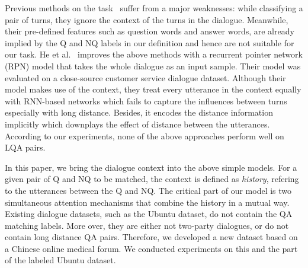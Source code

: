 Previous methods on the task~\cite{ding2008using,du2017discovering,jiang2018learning} suffer from a major weaknesses: while classifying a pair of turns, they ignore the context of the turns in the dialogue. Meanwhile, their pre-defined features such as question words and answer words, are already implied by the Q and NQ labels in our definition and hence are not suitable for our task. He et al.~ improves the above methods with a recurrent pointer network (RPN) model that takes the whole dialogue as an input sample. Their model was evaluated on a close-source customer service dialogue dataset. Although their model makes use of the context, they treat every utterance in the context equally with RNN-based networks which fails to capture the influences between turns especially with long distance. Besides, it encodes the distance information implicitly which downplays the effect of distance between the utterances. According to our experiments, none of the above approaches perform well on LQA pairs.


In this paper, we bring the dialogue context into the above simple models. 
For a given pair of Q and NQ to be matched, the context is defined as {\em history}, 
refering to the utterances between the Q and NQ. The critical part of our model 
is two simultaneous attention mechanisms that combine the history in a mutual way. 
Existing dialogue datasets, such as the Ubuntu dataset, do not contain
the QA matching labels. More over, they are either not two-party dialogues, or do not
contain long distance QA pairs. Therefore, we developed a new dataset based on
a Chinese online medical forum. We conducted experiments on this and the part of
the labeled Ubuntu dataset.  

